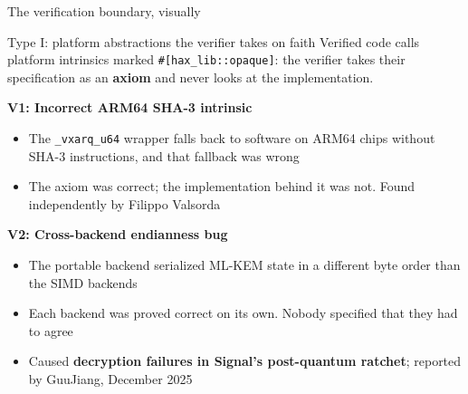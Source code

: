 \ifdefined\PRESENTATION\else\PassOptionsToClass{handout}{beamer}\fi\documentclass[aspectratio=169, lualatex]{beamer}
\begin{document}
\begin{frame}{The verification boundary, visually}
\begin{center}
{%
		}%
	\end{center}
\end{frame}

\begin{frame}{Type I: platform abstractions the verifier takes on faith}
	\small
	Verified code calls platform intrinsics marked \texttt{\#[hax\_lib::opaque]}: the verifier takes their specification as an \textbf{axiom} and never looks at the implementation.

	\textbf{V1: Incorrect ARM64 SHA-3 intrinsic}
	\begin{itemize}
		\item The \texttt{\_vxarq\_u64} wrapper falls back to software on ARM64 chips without SHA-3 instructions, and that fallback was wrong
		\item The axiom was correct; the implementation behind it was not. Found independently by Filippo Valsorda
	\end{itemize}
	\textbf{V2: Cross-backend endianness bug}
	\begin{itemize}
		\item The portable backend serialized ML-KEM state in a different byte order than the SIMD backends
		\item Each backend was proved correct on its own. Nobody specified that they had to agree
		\item Caused \textbf{decryption failures in Signal's post-quantum ratchet}; reported by GuuJiang, December 2025
	\end{itemize}
\end{frame}
\end{document}
